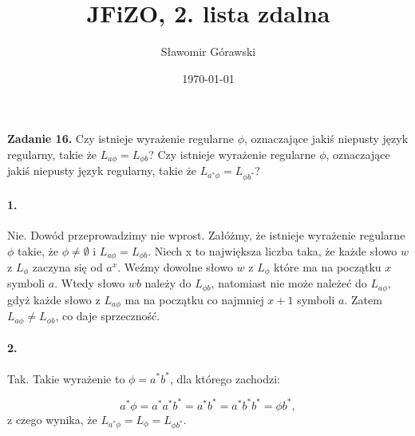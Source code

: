\documentclass{article}
\title{JFiZO, 2. lista zdalna}
\author{Sławomir Górawski}
\date{\today}
\begin{document}
\maketitle

\noindent\textbf{Zadanie 16.}
Czy istnieje wyrażenie regularne $\phi$,
oznaczające jakiś niepusty język regularny,
takie że $L_{a\phi} = L_{\phi b}$?
Czy istnieje wyrażenie regularne $\phi$,
oznaczające jakiś niepusty język
regularny, takie że $L_{a^*\phi} = L_{\phi b^*}$?

\paragraph{1.}
Nie. Dowód przeprowadzimy nie wprost.
Załóżmy, że istnieje wyrażenie regularne $\phi$
takie, że $\phi \neq \emptyset$ i $L_{a\phi} = L_{\phi b}$.
Niech x to największa liczba taka,
że każde słowo $w$ z $L_\phi$ zaczyna się od $a^x$.
Weźmy dowolne słowo $w$ z $L_\phi$
które ma na początku $x$ symboli $a$.
Wtedy słowo $wb$ należy do $L_{\phi b}$,
natomiast nie może należeć do $L_{a\phi}$,
gdyż każde słowo z $L_{a\phi}$ ma na początku
co najmniej $x + 1$ symboli $a$.
Zatem $L_{a\phi} \neq L_{\phi b}$, co daje sprzeczność.

\paragraph{2.}
Tak. Takie wyrażenie to $\phi = a^*b^*$, dla którego zachodzi:

\[
    a^*\phi = a^*a^*b^* = a^*b^* = a^*b^*b^* = \phi b^*,
\]
z czego wynika, że $L_{a^*\phi} = L_\phi = L_{\phi b^*}$.
\end{document}
